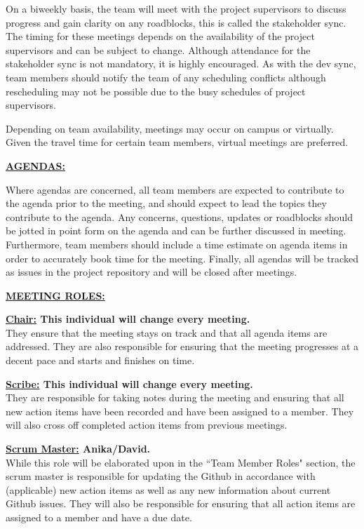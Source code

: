 \documentclass{article}
\begin{document}
On a biweekly basis, the team will meet with the project supervisors to discuss progress and gain clarity on any roadblocks, this is called the stakeholder sync.
The timing for these meetings depends on the availability of the project supervisors and can be subject to change.
Although attendance for the stakeholder sync is not mandatory, it is highly encouraged.
As with the dev sync, team members should notify the team of any scheduling conflicts although rescheduling may not be possible due to the busy schedules of project supervisors.

Depending on team availability, meetings may occur on campus or virtually.
Given the travel time for certain team members, virtual meetings are preferred.

\noindent \textbf{\underline{AGENDAS:}}

Where agendas are concerned, all team members are expected to contribute to the agenda prior to the meeting,
and should expect to lead the topics they contribute to the agenda.
Any concerns, questions, updates or roadblocks should be jotted in point form on the agenda and can be further discussed in meeting.
Furthermore, team members should include a time estimate on agenda items in order to accurately book time for the meeting.
Finally, all agendas will be tracked as issues in the project repository and will be closed after meetings.

\noindent \textbf{\underline{MEETING ROLES:}}

\noindent \textbf{\underline{Chair:} This individual will change every meeting. } \\
\noindent They ensure that the meeting stays on track and that all agenda items are addressed.
They are also responsible for ensuring that the meeting progresses at a decent pace and starts and finishes on time.

\noindent \textbf{\underline{Scribe:} This individual will change every meeting.} \\
\noindent They are responsible for taking notes during the meeting and ensuring that
all new action items have been recorded and have been assigned to a member.
They will also cross off completed action items from previous meetings.

\noindent \textbf{\underline{Scrum Master:} Anika/David.} \\
\noindent While this role will be elaborated upon in the ``Team Member Roles" section, the scrum master
is responsible for updating the Github in accordance with (applicable) new action items
as well as any new information about current Github issues.
They will also be responsible for ensuring that all action items are assigned to a member and have a due date.
\end{document}
